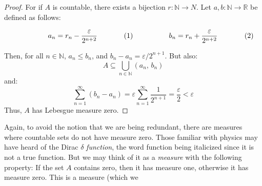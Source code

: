\documentclass[crop=false,class=article]{standalone}                           %
\begin{document}
        \begin{proof}
            For if $A$ is countable, there exists a bijection
            $r:\mathbb{N}\rightarrow{N}$. Let
            $a,b:\mathbb{N}\rightarrow\mathbb{R}$ be defined as follows:
            \par
            \begin{subequations}
                \begin{minipage}[b]{0.49\textwidth}
                    \begin{equation}
                        a_{n}=r_{n}-\frac{\varepsilon}{2^{n+2}}
                    \end{equation}
                \end{minipage}
                \hfill
                \begin{minipage}[b]{0.49\textwidth}
                    \begin{equation}
                        b_{n}=r_{n}+\frac{\varepsilon}{2^{n+2}}
                    \end{equation}
                \end{minipage}
            \end{subequations}
            \par\vspace{2.5ex}
            Then, for all $n\in\mathbb{N}$, $a_{n}\leq{b}_{n}$, and
            $b_{n}-a_{n}=\varepsilon/2^{n+1}$. But also:
            \begin{equation}
                A\subseteq\bigcup_{n\in\mathbb{N}}(a_{n},\,b_{n})
            \end{equation}
            and:
            \begin{equation}
                \sum_{n=1}^{\infty}(b_{n}-a_{n})
                =\varepsilon\sum_{n=1}^{\infty}\frac{1}{2^{n+1}}
                =\frac{\varepsilon}{2}<\varepsilon
            \end{equation}
            Thus, $A$ has Lebesgue measure zero.
        \end{proof}
        Again, to avoid the notion that we are being redundant, there are
        measures where countable sets do not have measure zero. Those
        familiar with physics may have heard of the Dirac
        $\delta$ \textit{function}, the word function being italicized since it
        is not a true function. But we may think of it as a \textit{measure}
        with the following property: If the set $A$ contains zero, then it has
        measure one, otherwise it has measure zero. This is a measure (which we
\end{document}
